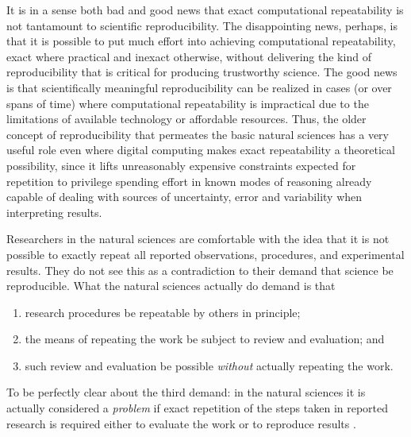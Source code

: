 It is in a sense both bad and good news that exact computational repeatability is not tantamount to scientific reproducibility.
The disappointing news, perhaps, is that it is possible to put much effort into achieving computational repeatability,
	exact where practical and inexact otherwise,
	without delivering the kind of reproducibility that is critical for producing trustworthy science.
The good news is that scientifically meaningful reproducibility can be realized in cases (or over spans of time)
	where computational repeatability is impractical due to the limitations of available technology or affordable resources.
Thus, the older concept of reproducibility that permeates the basic natural sciences has a very
	useful role even where digital computing makes exact repeatability a theoretical possibility,
    since it lifts unreasonably expensive constraints expected for repetition  to privilege
    spending effort in known modes of reasoning already capable of dealing with sources of
    uncertainty, error and variability when interpreting results.

 Researchers in the natural sciences are comfortable with the idea that it is not possible to exactly
	repeat all reported observations, procedures, and experimental results.
They do not see this as a contradiction to their demand that science be reproducible.
What the natural sciences actually do demand is that
\begin{enumerate}
\item research procedures be repeatable by others in principle;
\item the means of repeating the work be subject to review and
  evaluation; and
\item such review and evaluation be possible \emph{without}
  actually repeating the work.
\end{enumerate}
To be perfectly clear about the third demand: in the natural sciences
it is actually considered a \emph{problem} if exact repetition of the
steps taken in reported research is required either to evaluate the
work or to reproduce results \cite{milkowski2018replicability}.


